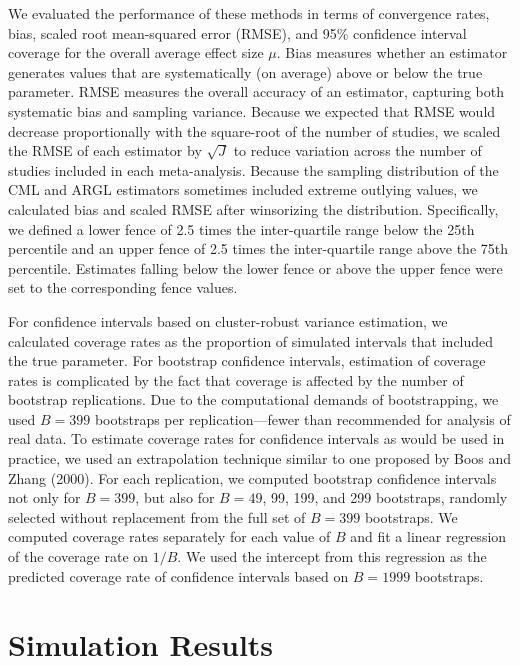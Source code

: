 \documentclass[
  man, donotrepeattitle,floatsintext]{apa7}
\begin{document}
We evaluated the performance of these methods in terms of convergence rates, bias,
scaled root mean-squared error (RMSE), and 95\% confidence interval coverage for the overall average effect size \(\mu\).
Bias measures whether an estimator generates values that are systematically (on average) above or below
the true parameter.
RMSE measures the overall accuracy of an estimator, capturing both systematic bias and sampling variance.
Because we expected that RMSE would decrease proportionally with the square-root of the number of studies, we scaled the RMSE of each estimator by \(\sqrt{J}\) to reduce variation across the number of studies included in each meta-analysis.
Because the sampling distribution of the CML and ARGL estimators sometimes included extreme outlying values, we calculated bias and scaled RMSE after winsorizing the distribution.
Specifically, we defined a lower fence of 2.5 times the inter-quartile range below the 25th percentile and an upper fence of 2.5 times the inter-quartile range above the 75th percentile.
Estimates falling below the lower fence or above the upper fence were set to the corresponding fence values.

For confidence intervals based on cluster-robust variance estimation, we calculated coverage rates as the proportion of simulated intervals that included the true parameter.
For bootstrap confidence intervals, estimation of coverage rates is complicated by the fact that coverage is affected by the number of bootstrap replications.
Due to the computational demands of bootstrapping, we used \(B = 399\) bootstraps per replication---fewer than recommended for analysis of real data.
To estimate coverage rates for confidence intervals as would be used in practice, we used an extrapolation technique similar to one proposed by Boos and Zhang (2000).
For each replication, we computed bootstrap confidence intervals not only for \(B = 399\), but also for \(B = 49\), 99, 199, and 299 bootstraps, randomly selected without replacement from the full set of \(B = 399\) bootstraps.
We computed coverage rates separately for each value of \(B\) and fit a linear regression of the coverage rate on \(1 / B\).
We used the intercept from this regression as the predicted coverage rate of confidence intervals based on \(B = 1999\) bootstraps.

\section{Simulation Results}\label{simulation-results}
\end{document}

